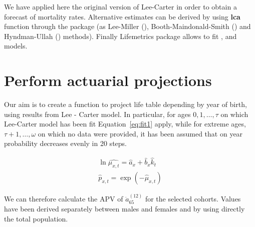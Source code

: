 \documentclass[nojss]{jss}
\begin{document}
We have applied here the original version of Lee-Carter in order to obtain a forecast of mortality rates.
Alternative estimates can be derived by using \textbf{lca} function through the  package (as Lee-Miller (\cite{LM}), Booth-Maindonald-Smith (\cite{BMS}) and Hyndman-Ullah (\cite{Hyn}) methods).
Finally Lifemetrics package allows to fit  \cite{BDV}, \cite{RH} and \cite{CBD} models.

\section{Perform actuarial projections}
Our aim is to create a function to project life table depending by year of birth,
using results from Lee - Carter model. 
In particular, for ages $0, 1, \ldots, \tau$ on which Lee-Carter model has been fit Equation~\ref{eq:fit1} apply, while for extreme
ages, $\tau + 1, \ldots, \omega$ on which no data were provided, it has been
assumed that on year probability decreases evenly in 20 steps.

\begin{equation}
\begin{array}{l}
\ln {\hat{\mu_{x,t}}} = \hat{a}_{x} + \hat{b}_{x}\hat{k}_{t}\\
\hat{p}_{x,t} = \exp \left(- \hat {\mu }_{x,t} \right)
\end{array}
\label{eq:fit1}
\end{equation}



\begin{Schunk}
\end{Schunk}

We can therefore calculate the APV of $\ddot{a}_{65}^{(12)}$ for the selected cohorts.
Values have been derived separately between males and females and by using directly the total population.
\end{document}
